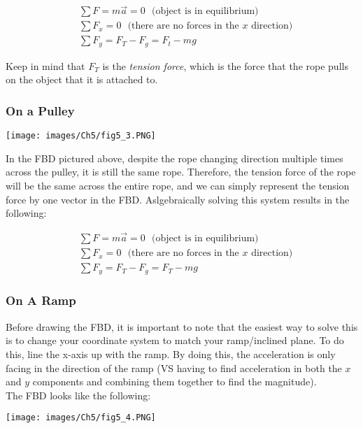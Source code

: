 $$
	\begin{aligned}
		&\sum F = m\vec{a} = 0 \:\:\:\text{(object is in equilibrium)}\\
		&\sum F_x = 0 \:\:\:\text{(there are no forces in the $x$ direction)}\\
		&\sum F_y = F_T - F_g = F_t - mg
	\end{aligned}
$$

Keep in mind that $F_T$ is the \textit{tension force}, which is the force that the rope pulls on the object that it is attached to.

\subsubsection*{On a Pulley}

\begin{center}\texttt{[image: images/Ch5/fig5\_3.PNG]}\end{center}

In the FBD pictured above, despite the rope changing direction multiple times across the pulley, it is still the same rope. Therefore, the tension force of the rope will be the same across the entire rope, and we can simply represent the tension force by one vector in the FBD. Aslgebraically solving this system results in the following:

$$
	\begin{aligned}
		&\sum F = m\vec{a} = 0 \:\:\:\text{(object is in equilibrium)}\\
		&\sum F_x = 0 \:\:\:\text{(there are no forces in the $x$ direction)}\\
		&\sum F_y = F_T - F_g = F_T - mg
	\end{aligned}
$$

\subsubsection*{On A Ramp}

Before drawing the FBD, it is important to note that the easiest way to solve this is to change your coordinate system to match your ramp/inclined plane. To do this, line the x-axis up with the ramp. By doing this, the acceleration is only facing in the direction of the ramp (VS having to find acceleration in both the $x$ and $y$ components and combining them together to find the magnitude).\\

The FBD looks like the following:

\begin{center}\texttt{[image: images/Ch5/fig5\_4.PNG]}\end{center}


